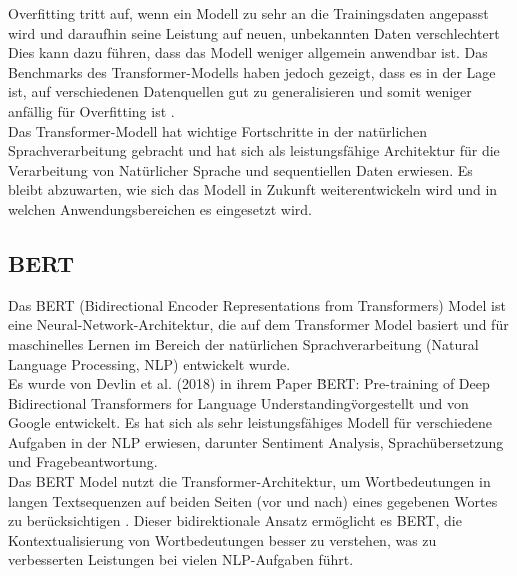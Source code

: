 \documentclass[oneside,bibliography=totocnumbered,BCOR=5mm]{scrbook}%
\theoremstyle{definition}
\theoremstyle{definition}
\theoremstyle{definition}
\theoremstyle{definition}
\theoremstyle{definition}
\theoremstyle{definition}
\begin{document}
Overfitting tritt auf, wenn ein Modell zu sehr an die Trainingsdaten angepasst wird und daraufhin seine Leistung auf neuen, 
unbekannten Daten verschlechtert \autocite[Seite 81]{MLgood2know}
Dies kann dazu führen, dass das Modell weniger allgemein anwendbar ist. 
Das Benchmarks des Transformer-Modells haben jedoch gezeigt, dass es in der Lage ist, auf verschiedenen Datenquellen gut zu generalisieren 
und somit weniger anfällig für Overfitting ist \autocite[Seite 9]{transformer}. \\


Das Transformer-Modell hat wichtige Fortschritte in der natürlichen Sprachverarbeitung gebracht 
und hat sich als leistungsfähige Architektur für die Verarbeitung von Natürlicher Sprache und sequentiellen Daten erwiesen. 
Es bleibt abzuwarten, wie sich das Modell in Zukunft weiterentwickeln wird und in welchen Anwendungsbereichen es eingesetzt wird. \\


\subsection{BERT}


Das BERT (Bidirectional Encoder Representations from Transformers) Model ist eine Neural-Network-Architektur, 
die auf dem Transformer Model basiert und für maschinelles Lernen im Bereich der natürlichen 
Sprachverarbeitung (Natural Language Processing, NLP) entwickelt wurde. \\


Es wurde von Devlin et al. (2018) in ihrem Paper \"BERT: Pre-training of Deep Bidirectional Transformers for 
Language Understanding\" vorgestellt und von Google entwickelt. 
Es hat sich als sehr leistungsfähiges Modell für verschiedene Aufgaben in der NLP erwiesen, 
darunter Sentiment Analysis, Sprachübersetzung und Fragebeantwortung. \\


Das BERT Model nutzt die Transformer-Architektur, um Wortbedeutungen in langen Textsequenzen auf 
beiden Seiten (vor und nach) eines gegebenen Wortes zu berücksichtigen \autocite[Seite 5]{bert}. 
Dieser bidirektionale Ansatz ermöglicht es BERT, die Kontextualisierung von Wortbedeutungen besser zu verstehen, 
was zu verbesserten Leistungen bei vielen NLP-Aufgaben führt.  \\
\end{document}
